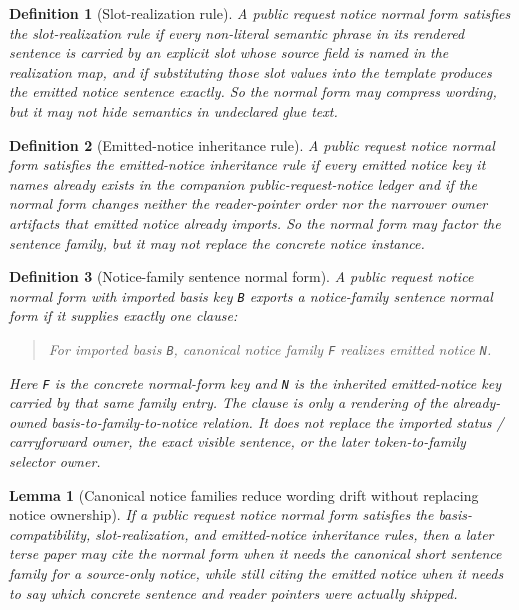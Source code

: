 \documentclass[11pt]{article}
\newtheorem{definition}{Definition}
\newtheorem{lemma}{Lemma}
\begin{document}
\begin{definition}[Slot-realization rule]
A public request notice normal form satisfies the \emph{slot-realization rule} if every non-literal semantic phrase in its rendered sentence is carried by an explicit slot whose source field is named in the realization map, and if substituting those slot values into the template produces the emitted notice sentence exactly.
So the normal form may compress wording, but it may not hide semantics in undeclared glue text.
\end{definition}

\begin{definition}[Emitted-notice inheritance rule]
A public request notice normal form satisfies the \emph{emitted-notice inheritance rule} if every emitted notice key it names already exists in the companion public-request-notice ledger and if the normal form changes neither the reader-pointer order nor the narrower owner artifacts that emitted notice already imports.
So the normal form may factor the sentence family, but it may not replace the concrete notice instance.
\end{definition}

\begin{definition}[Notice-family sentence normal form]
A public request notice normal form with imported basis key \texttt{B} exports a \emph{notice-family sentence normal form} if it supplies exactly one clause:
\begin{quote}\small
For imported basis \texttt{B}, canonical notice family \texttt{F} realizes emitted notice \texttt{N}.
\end{quote}
Here \texttt{F} is the concrete normal-form key and \texttt{N} is the inherited emitted-notice key carried by that same family entry. The clause is only a rendering of the already-owned basis-to-family-to-notice relation. It does not replace the imported status / carryforward owner, the exact visible sentence, or the later token-to-family selector owner.
\end{definition}

\begin{lemma}[Canonical notice families reduce wording drift without replacing notice ownership]
If a public request notice normal form satisfies the basis-compatibility, slot-realization, and emitted-notice inheritance rules, then a later terse paper may cite the normal form when it needs the canonical short sentence family for a source-only notice, while still citing the emitted notice when it needs to say which concrete sentence and reader pointers were actually shipped.
\end{lemma}
\end{document}
